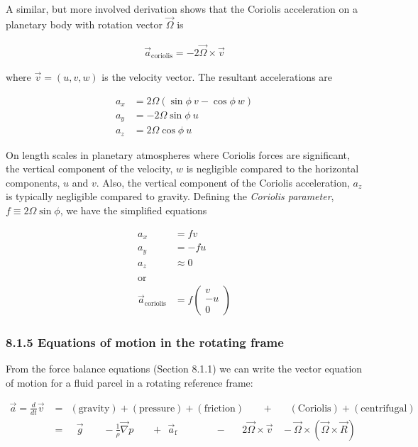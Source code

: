 \documentclass[11pt]{article}
\begin{document}
    A similar, but more involved derivation shows that the Coriolis
acceleration on a planetary body with rotation vector \(\vec{\Omega}\)
is

\begin{align}
    \vec{a}_\mathrm{coriolis} = -2\vec{\Omega}\times\vec{v}
\end{align}

where \(\vec{v} = (u,v,w)\) is the velocity vector. The resultant
accelerations are

\begin{align}
    a_x &= 2\Omega(\sin\phi~v - \cos\phi~w) \\
    a_y &= -2\Omega\sin\phi~u \\
    a_z &= 2\Omega\cos\phi~u
\end{align}

On length scales in planetary atmospheres where Coriolis forces are
significant, the vertical component of the velocity, \(w\) is negligible
compared to the horizontal components, \(u\) and \(v\). Also, the
vertical component of the Coriolis acceleration, \(a_z\) is typically
negligible compared to gravity. Defining the \emph{Coriolis parameter},
\(f \equiv 2\Omega\sin\phi\), we have the simplified equations

\begin{align}
    a_x &= fv \\
    a_y &= -fu \\
    a_z &\approx 0 \\
    \\
    \mathrm{or} \\
    \vec{a}_\mathrm{coriolis} &= f\begin{pmatrix} v \\ -u \\ 0 \end{pmatrix}
\end{align}

\subsubsection{8.1.5 Equations of motion in the rotating
frame}\label{equations-of-motion-in-the-rotating-frame}

From the force balance equations (Section 8.1.1) we can write the vector
equation of motion for a fluid parcel in a rotating reference frame:

\begin{align}
    \vec{a} = \frac{d}{dt}\vec{v} &= ~~(\mathrm{gravity}) + (\mathrm{pressure}) + (\mathrm{friction})~~~~~~~~+ ~~~~~~~(\mathrm{Coriolis}) + (\mathrm{centrifugal}) \\
    &= ~~~~~\vec{g} ~~~~~~~~~ - \frac{1}{\rho}\vec{\nabla}p ~~~~~~~~ + ~~\vec{a}_\mathrm{f}~~~~~~~~~~~~~~~~~- ~~~~~~~2\vec{\Omega}\times\vec{v} ~~~~- \vec{\Omega}\times(\vec{\Omega}\times\vec{R}) \\
\end{align}
\end{document}
